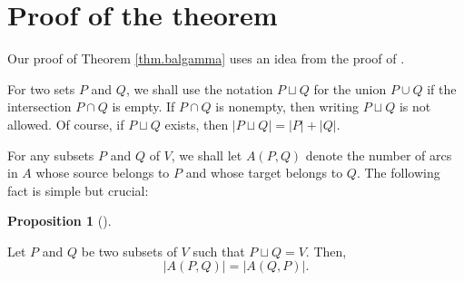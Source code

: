 \documentclass[numbers=enddot,12pt,final,onecolumn,notitlepage]{scrartcl}%
\theoremstyle{definition}
\newtheorem{prop}[theo]{Proposition}
\newenvironment{proposition}[1][]
{\begin{prop}[#1]\begin{leftbar}}
{\end{leftbar}\end{prop}}
\theoremstyle{plainsl}
\begin{document}
\section{Proof of the theorem}

Our proof of Theorem \ref{thm.balgamma} uses an idea from the proof of
\cite[Proposition 3.7]{PerPha15}.

For two sets $P$ and $Q$, we shall use the notation $P\sqcup Q$ for the union
$P\cup Q$ if the intersection $P\cap Q$ is empty. If $P\cap Q$ is nonempty,
then writing $P\sqcup Q$ is not allowed. Of course, if $P\sqcup Q$ exists,
then $\left\vert P\sqcup Q\right\vert =\left\vert P\right\vert +\left\vert
Q\right\vert $.

For any subsets $P$ and $Q$ of $V$, we shall let $A\left(  P,Q\right)  $
denote the number of arcs in $A$ whose source belongs to $P$ and whose target
belongs to $Q$. The following fact is simple but crucial:

\begin{proposition}
\label{prop.A-symmetryOLD}Let $P$ and $Q$ be two subsets of $V$ such that
$P\sqcup Q=V$. Then,
\[
\left\vert A\left(  P,Q\right)  \right\vert =\left\vert A\left(  Q,P\right)
\right\vert .
\]

\end{proposition}
\end{document}
